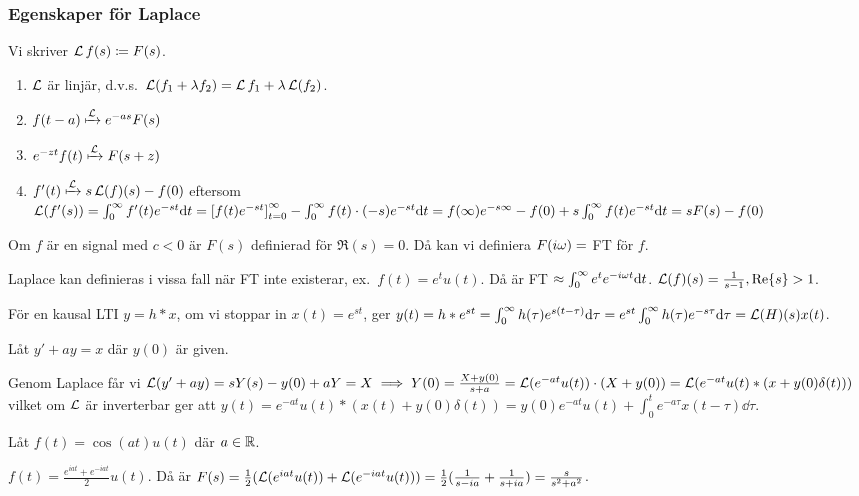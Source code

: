 \documentclass[a4paper]{article}
\begin{document}
\subsubsection{Egenskaper för Laplace}
Vi skriver \(
    \operatorname{\mathcal{L}} f(s) \coloneqq F(s)
\).

\begin{enumerate}
    \item \(
        \operatorname{\mathcal{L}} 
    \) är linjär, d.v.s.\ \(
        \operatorname{\mathcal{L}}(f_1+\lambda f_2) = \operatorname{\mathcal{L}} f_1 + \lambda \operatorname{\mathcal{L}}(f_2)
    \).

    \item \(
        f(t-a) \xmapsto{\operatorname{\mathcal{L}}} e^{-as} F(s)
    \) 

    \item \(
        e^{-zt} f(t) \xmapsto{\operatorname{\mathcal{L}}} F(s+z)
    \) 

    \item \(
        f'(t) \xmapsto{\operatorname{\mathcal{L}}} s \operatorname{\mathcal{L}}(f)(s) - f(0)
    \) eftersom \(
        \operatorname{\mathcal{L}}(f'(s)) = \int_0^\infty f'(t) e^{-st} \dd t
        = \left[ f(t) e^{-st} \right]_{t=0}^\infty - \int_0^\infty f(t) \cdot (-s) e^{-st} \dd t
        = f(\infty) e^{-s\infty} - f(0) + s \int_0^\infty f(t) e^{-st} \dd t 
        = sF(s) - f(0)
    \) 
\end{enumerate}

Om \(
    f
\) är en signal med  \(
    c < 0
\) är \(
    F(s) 
\) definierad för \(
    \Re(s) = 0
\). Då kan vi definiera \(
    F(i\omega) = 
\) FT för \(
    f
\).

Laplace kan definieras i vissa fall när FT inte existerar, ex.\ \(
    f(t) = e^t u(t)
\). Då är FT \(
    \approx \int_0^\infty e^t e^{-i\omega t} \dd t
\). \(
    \operatorname{\mathcal{L}}(f)(s) = \frac{1}{s-1}, \Re{s} > 1
\).

För en kausal LTI \(
    y=h*x
\), om vi stoppar in \(
    x(t) = e^{st} 
\), ger \(
    y(t) = h * e^{st}
         = \int_0^\infty h(\tau) e^{s(t-\tau)} \dd \tau
         = e^{st} \int_0^\infty h(\tau) e^{-s\tau} \dd \tau
         = \operatorname{\mathcal{L}}(H)(s) x(t)
\).

Låt \(
    y' + ay = x
\) där \(
    y(0) 
\) är given.

Genom Laplace får vi \(
    \operatorname{\mathcal{L}}(y' + ay) = s Y(s) - y(0) + aY = X
        \implies Y(0) = \frac{X+y(0)}{s+a} 
            = \operatorname{\mathcal{L}}(e^{-at}u(t))\cdot (X+y(0))
            = \operatorname{\mathcal{L}}(e^{-at}u(t) * (x + y(0) \delta(t)))
\) vilket om \(
    \operatorname{\mathcal{L}}
\) är inverterbar ger att \(
    y(t) = e^{-at} u(t) * (x(t) + y(0) \delta(t))
         = y(0) e^{-at} u(t) + \int_0^t e^{-a\tau} x(t-\tau) \dd \tau
\).

\begin{ex}
    Låt \(
        f(t) = \cos(at) u(t)
    \) där \(
        a \in \mathbb{R}
    \).

    \(
        f(t) = \frac{e^{iat} + e^{-iat}}{2} u(t) 
    \). Då är \(
        F(s) = \frac{1}{2} (\operatorname{\mathcal{L}}(e^{iat} u(t)) + \operatorname{\mathcal{L}}(e^{-iat} u(t)))
             = \frac{1}{2}( \frac{1}{s-ia} + \frac{1}{s+ia} ) 
             = \frac{s}{s^2+a^2} 
    \).
\end{ex}
\end{document}
